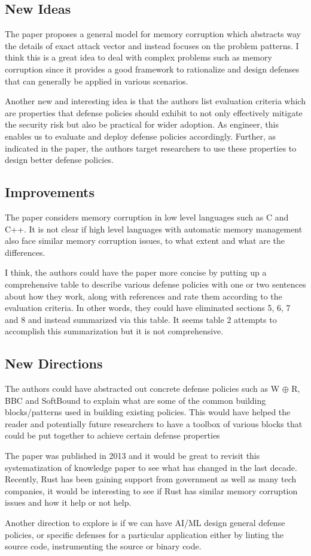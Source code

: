 \documentclass[12pt]{article}
\begin{document}
    \subsection*{New Ideas}
    The paper proposes a general model for memory corruption which abstracts way the details of exact attack vector and instead focuses on the problem patterns. I think this is a great idea to deal with complex problems such as memory corruption since it provides a good framework to rationalize and design defenses that can generally be applied in various scenarios.

    Another new and interesting idea is that the authors list evaluation criteria which are properties that defense policies should exhibit to not only effectively mitigate the security risk but also be practical for wider adoption. As engineer, this enables us to evaluate and deploy defense policies accordingly. Further, as indicated in the paper, the authors target researchers to use these properties to design better defense policies.

    \subsection*{Improvements}
    The paper considers memory corruption in low level languages such as C and C++. It is not clear if high level languages with automatic memory management also face similar memory corruption issues, to what extent and what are the differences.

    I think, the authors could have the paper more concise by putting up a comprehensive table to describe various defense policies with one or two sentences about how they work, along with references and rate them according to the evaluation criteria. In other words, they could have eliminated sections 5, 6, 7 and 8 and instead summarized via this table. It seems table 2 attempts to accomplish this summarization but it is not comprehensive.

    \subsection*{New Directions}
    The authors could have abstracted out concrete defense policies such as W ${\oplus}$ R, BBC and SoftBound to explain what are some of the common building blocks/patterns used in building existing policies. This would have helped the reader and potentially future researchers to have a toolbox of various blocks that could be put together to achieve certain defense properties
    
    The paper was published in 2013 and it would be great to revisit this systematization of knowledge paper to see what has changed in the last decade. Recently, Rust has been gaining support from government as well as many tech companies, it would be interesting to see if Rust has similar memory corruption issues and how it help or not help.

    Another direction to explore is if we can have AI/ML design general defense policies, or specific defenses for a particular application either by linting the source code, instrumenting the source or binary code.
\end{document}
